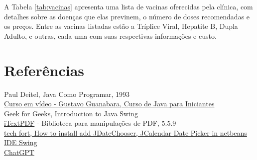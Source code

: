 \documentclass{article}
\begin{document}
        A Tabela \ref{tab:vacinas} apresenta uma lista de vacinas oferecidas pela clínica, com detalhes sobre as doenças que elas previnem, o número de doses recomendadas e os preços. Entre as vacinas listadas estão a Tríplice Viral, Hepatite B, Dupla Adulto, e outras, cada uma com suas respectivas informações e custo.

        \vspace{20mm}

        \section{Referências}

            
              
            Paul Deitel, Java Como Programar, 1993
            \\
            \href{https://www.youtube.com/playlist?list=PLHz_AreHm4dkI2ZdjTwZA4mPMxWTfNSpR}{Curso em vídeo - Gustavo Guanabara, Curso de Java para Iniciantes}
            \\
            Geek for Geeks, Introduction to Java Swing
            \\
             \href{https://jar-download.com/artifacts/com.itextpdf/itextpdf/5.5.9/source-code}{iTextPDF} - Biblioteca para manipulações de PDF, 5.5.9 
            \\
            \href{https://www.youtube.com/watch?v=4c3WYK5FpqI&t=463s&ab_channel=techfort}{tech fort, How to install add JDateChooser, JCalendar Date Picker in netbeans IDE Swing}
            \\
            \href{https://chatgpt.com/}{ChatGPT}
            \\
\end{document}
